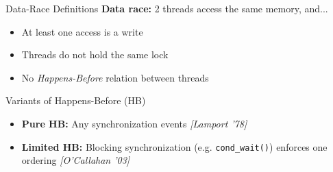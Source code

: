 \documentclass[xcolor=dvipsnames]{beamer}
\begin{document}
\begin{frame}{Data-Race Definitions}
	\textbf{Data race:} 2 threads access the same memory, and...
	\begin{itemize}
		\item At least one access is a write
		\item Threads do not hold the same lock
		\item No {\em Happens-Before} relation between threads
	\end{itemize}
	\pause
	\linegap

	Variants of Happens-Before (HB)
	\begin{itemize}
		\item {\bf Pure HB:} Any synchronization events {\em [Lamport '78]}
		\item {\bf Limited HB:} Blocking synchronization (e.g. \texttt{cond\_wait()}) enforces one ordering {\em [O'Callahan '03]}
	\end{itemize}
\end{frame}
\end{document}
